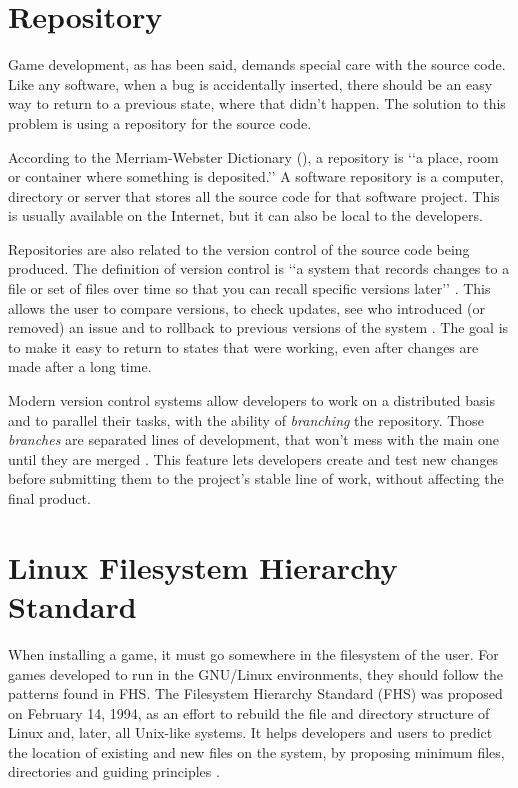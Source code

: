 

\section{Repository}
\label {sec:repository}

Game development, as has been said, demands special care with the source code. Like any software, when a bug is accidentally inserted, there should be an easy way to return to a previous state, where that didn't happen. The solution to this problem is using a repository for the source code.

According to the Merriam-Webster Dictionary (\citeyear{webster2017repository}), a repository is \lq\lq a place, room or container where something is deposited.\rq\rq{} A software repository is a computer, directory or server that stores all the source code for that software project. This is usually available on the Internet, but it can also be local to the developers.

Repositories are also related to the version control of the source code being produced. The definition of version control is \lq\lq a system that records changes to a file or set of files over time so that you can recall specific versions later\rq\rq{} \cite{loeliger2012version}. This allows the user to compare versions, to check updates, see who introduced (or removed) an issue and to rollback to previous versions of the system \cite{chacon2014pro}. The goal is to make it easy to return to states that were working, even after changes are made after a long time.

Modern version control systems allow developers to work on a distributed basis and to parallel their tasks, with the ability of \textit{branching} the repository. Those \textit{branches} are separated lines of development, that won't mess with the main one until they are merged \cite{westby2015git}. This feature lets developers create and test new changes before submitting them to the project's stable line of work, without affecting the final product.

\section{Linux Filesystem Hierarchy Standard}
\label {sec:fhs}

When installing a game, it must go somewhere in the filesystem of the user. For games developed to run in the GNU/Linux environments, they should follow the patterns found in FHS. The Filesystem Hierarchy Standard (FHS) was proposed on February 14, 1994, as an effort to rebuild the file and directory structure of Linux and, later, all Unix-like systems. It helps developers and users to predict the location of existing and new files on the system, by proposing minimum files, directories and guiding principles \cite{bandel2001special}.

